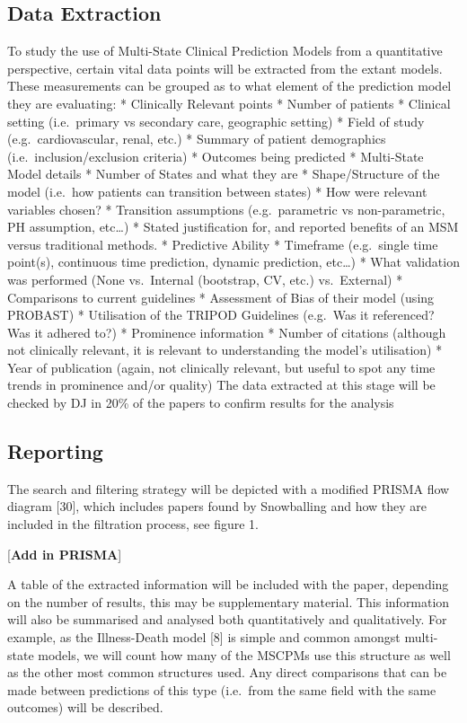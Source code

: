 \documentclass[12pt,PhD,twoside,openright]{muthesis}
\begin{document}
\hypertarget{data-extraction}{%
\subsection{Data Extraction}\label{data-extraction}}

To study the use of Multi-State Clinical Prediction Models from a quantitative perspective, certain vital data points will be extracted from the extant models. These measurements can be grouped as to what element of the prediction model they are evaluating:
* Clinically Relevant points
* Number of patients
* Clinical setting (i.e.~primary vs secondary care, geographic setting)
* Field of study (e.g.~cardiovascular, renal, etc.)
* Summary of patient demographics (i.e.~inclusion/exclusion criteria)
* Outcomes being predicted
* Multi-State Model details
* Number of States and what they are
* Shape/Structure of the model (i.e.~how patients can transition between states)
* How were relevant variables chosen?
* Transition assumptions (e.g.~parametric vs non-parametric, PH assumption, etc\ldots)
* Stated justification for, and reported benefits of an MSM versus traditional methods.
* Predictive Ability
* Timeframe (e.g.~single time point(s), continuous time prediction, dynamic prediction, etc\ldots)
* What validation was performed (None vs.~Internal (bootstrap, CV, etc.) vs.~External)
* Comparisons to current guidelines
* Assessment of Bias of their model (using PROBAST)
* Utilisation of the TRIPOD Guidelines (e.g.~Was it referenced? Was it adhered to?)
* Prominence information
* Number of citations (although not clinically relevant, it is relevant to understanding the model's utilisation)
* Year of publication (again, not clinically relevant, but useful to spot any time trends in prominence and/or quality)
The data extracted at this stage will be checked by DJ in 20\% of the papers to confirm results for the analysis

\hypertarget{reporting}{%
\subsection{Reporting}\label{reporting}}

The search and filtering strategy will be depicted with a modified PRISMA flow diagram {[}30{]}, which includes papers found by Snowballing and how they are included in the filtration process, see figure 1.

{[}\textbf{Add in PRISMA}{]}

A table of the extracted information will be included with the paper, depending on the number of results, this may be supplementary material. This information will also be summarised and analysed both quantitatively and qualitatively. For example, as the Illness-Death model {[}8{]} is simple and common amongst multi-state models, we will count how many of the MSCPMs use this structure as well as the other most common structures used. Any direct comparisons that can be made between predictions of this type (i.e.~from the same field with the same outcomes) will be described.
\end{document}
